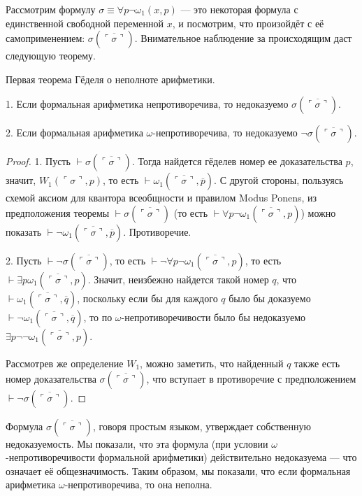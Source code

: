 Рассмотрим формулу $\sigma \equiv \forall p \neg \omega_1(x,p)$ --- это некоторая формула
с единственной свободной переменной $x$, и посмотрим, что произойдёт с её самоприменением:
$\sigma(\overline{\ulcorner\sigma\urcorner})$. Внимательное наблюдение за
происходящим даст следующую теорему.

\begin{theorem}{Первая теорема Гёделя о неполноте арифметики.}

1. Если формальная арифметика непротиворечива, то недоказуемо $\sigma(\overline{\ulcorner\sigma\urcorner})$.

2. Если формальная арифметика $\omega$-непротиворечива, то недоказуемо $\neg \sigma(\overline{\ulcorner\sigma\urcorner})$.
\end{theorem}

\begin{proof}
1. Пусть $\vdash \sigma(\overline{\ulcorner\sigma\urcorner})$. Тогда найдется гёделев номер ее 
доказательства $p$, значит, $W_1(\ulcorner\sigma\urcorner,p)$, то есть $\vdash \omega_1 (\overline{\ulcorner\sigma\urcorner},\overline{p})$. 
С другой стороны, пользуясь схемой аксиом для квантора всеобщности и правилом Modus Ponens, из 
предположения теоремы $\vdash \sigma(\overline{\ulcorner\sigma\urcorner})$ 
(то есть $\vdash \forall p \neg \omega_1(\overline{\ulcorner\sigma\urcorner},p)$)
можно показать $\vdash \neg \omega_1(\overline{\ulcorner\sigma\urcorner},\overline{p})$. 
Противоречие.

2. Пусть $\vdash \neg \sigma(\overline{\ulcorner\sigma\urcorner})$, то есть 
$\vdash \neg \forall p \neg \omega_1(\overline{\ulcorner\sigma\urcorner},p)$,
то есть $\vdash \exists p \omega_1(\overline{\ulcorner\sigma\urcorner},p)$.
Значит, неизбежно найдется такой номер $q$, что
$\vdash \omega_1 (\overline{\ulcorner\sigma\urcorner},\overline{q})$, поскольку 
если бы для каждого $q$ было бы доказуемо $\vdash \neg \omega_1 (\overline{\ulcorner\sigma\urcorner},\overline{q})$,
то по $\omega$-непротиворечивости было бы недоказуемо
$\exists p \neg\neg \omega_1(\overline{\ulcorner\sigma\urcorner},p)$.

Рассмотрев же определение $W_1$, можно заметить, что найденный $q$ также есть
номер доказательства $\sigma(\overline{\ulcorner\sigma\urcorner})$, что
вступает в противоречие с предположением $\vdash \neg \sigma(\overline{\ulcorner\sigma\urcorner})$.
\end{proof}

Формула $\sigma(\overline{\ulcorner\sigma\urcorner})$, говоря простым языком, утверждает 
собственную недоказуемость. Мы показали, что эта формула (при условии 
$\omega$-непротиворечивости формальной арифметики) действительно 
недоказуема --- что означает её общезначимость. Таким образом, мы 
показали, что если формальная арифметика $\omega$-непротиворечива, 
то она неполна.

